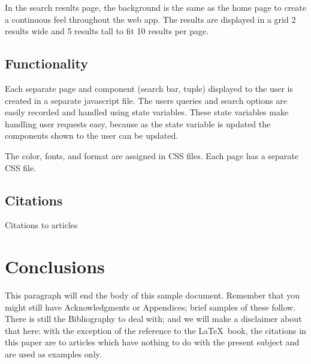 In the search results page, the background is the same as the home page to create a continuous feel throughout the web app. The results are displayed in a grid 2 results wide and 5 results tall to fit 10 results per page. 

\subsection{Functionality}
Each separate page and component (search bar, tuple) displayed to the user is created in a separate javascript file. The users queries and search options are easily recorded and handled using state variables. These state variables make handling user requests easy, because as the state variable is updated the components shown to the user can be updated. 

The color, fonts, and format are assigned in CSS files. Each page has a separate CSS file. 

\subsection{Citations}
Citations to articles

\section{Conclusions}
This paragraph will end the body of this sample document.
Remember that you might still have Acknowledgments or
Appendices; brief samples of these
follow.  There is still the Bibliography to deal with; and
we will make a disclaimer about that here: with the exception
of the reference to the \LaTeX\ book, the citations in
this paper are to articles which have nothing to
do with the present subject and are used as
examples only.



